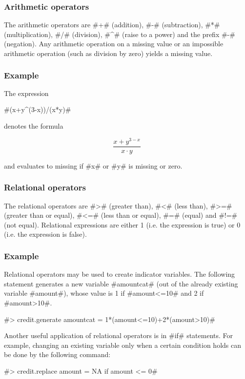 \subsubsection{Arithmetic operators}

The arithmetic operators are #+# (addition), #-# (subtraction),
#*# (multiplication), #/# (division), #^# (raise to a power) and
the prefix #-# (negation). Any arithmetic operation on a missing
value or an impossible arithmetic operation (such as division by zero) yields a missing value.

\subsubsection*{Example}

The expression

#(x+y^(3-x))/(x*y)#

denotes the formula

$$
\frac{x+y^{3-x}}{x\cdot y}
$$

and evaluates to missing if #x# or #y# is missing or zero.


\subsubsection{Relational operators}

The relational operators are #># (greater than), #<# (less than),
#>=# (greater than or equal), #<=# (less than or equal), #=#
(equal) and #!=# (not equal). Relational expressions are either
1 (i.e. the expression is true) or 0 (i.e. the expression is false).

\subsubsection*{Example}

Relational operators may be used to create indicator variables.
The following statement generates a new variable #amountcat# (out
of the already existing variable #amount#), whose
value is 1 if #amount<=10# and 2 if #amount>10#.

#> credit.generate amountcat = 1*(amount<=10)+2*(amount>10)#

Another useful application of relational operators is in #if#
statements. For example, changing
an existing variable only when a certain condition holds can be done by the following command:

#> credit.replace amount = NA if amount <= 0#


